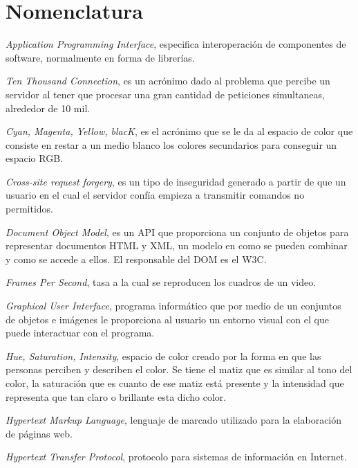 \chapter{Nomenclatura}

\begin{description}[labelindent=1cm,labelwidth=2.25cm,align=left,leftmargin=3.45cm]  %
	\item[$API$] \emph{Application Programming Interface}, especifica interoperación de componentes de software, normalmente en forma de librerías.
	\item[$C10k$] \emph{Ten Thousand Connection}, es un acrónimo dado al problema que percibe un servidor al tener que procesar una gran cantidad de peticiones simultaneas, alrededor de 10 mil.
	\item[$CMYK$] \emph{Cyan, Magenta, Yellow, blacK}, es el acrónimo que se le da al espacio de color que consiste en restar a un medio blanco los colores secundarios para conseguir un espacio RGB.
	\item[$CSRF$] \emph{Cross-site request forgery}, es un tipo de inseguridad generado a partir de que un usuario en el cual el servidor confía empieza a transmitir comandos no permitidos.
	\item[$DOM$] \emph{Document Object Model}, es un API que proporciona un conjunto de objetos para representar documentos HTML y XML, un modelo en como se pueden combinar y como se accede a ellos. El responsable del DOM es el W3C.
	\item [$FPS$] \emph{Frames Per Second}, tasa a la cual se reproducen los cuadros de un video.
	\item[$GUI$] \emph{Graphical User Interface}, programa informático que por medio de un conjuntos de objetos e imágenes le proporciona al usuario un entorno visual con el que puede interactuar con el programa.
	\item[$HSI$] \emph{Hue, Saturation, Intensity}, espacio de color creado por la forma en que las personas perciben y describen el color. Se tiene el matiz que es similar al tono del color, la saturación que es cuanto de ese matiz está presente y la intensidad que representa que tan claro o brillante esta dicho color.
	\item[$HTML$] \emph{Hypertext Markup Language}, lenguaje de marcado utilizado para la elaboración de páginas web.
	\item[$HTTP$] \emph{Hypertext Transfer Protocol}, protocolo para sistemas de información en Internet.

\end{description}
